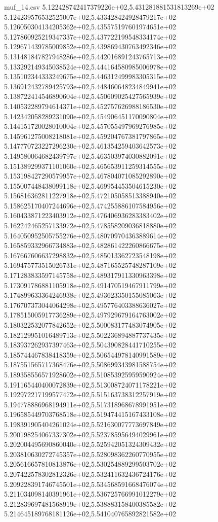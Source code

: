 \begin{filecontents*}{muf_14.csv}
5.122428742417379226e+02,5.431281881531813269e+02
5.124239576532525007e+02,5.433428424928479217e+02
5.126050304134205362e+02,5.435575197601974651e+02
5.127860925219347337e+02,5.437722199548334174e+02
5.129671439785009852e+02,5.439869430763492346e+02
5.131481847827948286e+02,5.442016891243765713e+02
5.133292149345038524e+02,5.444164580985006978e+02
5.135102344333249675e+02,5.446312499983305315e+02
5.136912432789425793e+02,5.448460648234849941e+02
5.138722414546890604e+02,5.450609025427565939e+02
5.140532289794614371e+02,5.452757626988186530e+02
5.142342058289231090e+02,5.454906451170090804e+02
5.144151720028010004e+02,5.457055497969276985e+02
5.145961275008218081e+02,5.459204767381797865e+02
5.147770723227296230e+02,5.461354259403642573e+02
5.149580064682439797e+02,5.463503974030882091e+02
5.151389299371101060e+02,5.465653911259314555e+02
5.153198427290579957e+02,5.467804071085292890e+02
5.155007448438099118e+02,5.469954453504615230e+02
5.156816362811227918e+02,5.472105058513388940e+02
5.158625170407244696e+02,5.474255886107584956e+02
5.160433871223403912e+02,5.476406936283383402e+02
5.162242465257133972e+02,5.478558209036818880e+02
5.164050952505755276e+02,5.480709704363889614e+02
5.165859332966734883e+02,5.482861422260866675e+02
5.167667606637298832e+02,5.485013362723548198e+02
5.169475773515026731e+02,5.487165525748287109e+02
5.171283833597145758e+02,5.489317911330963398e+02
5.173091786881105918e+02,5.491470519467911799e+02
5.174899633364246938e+02,5.493623350155085063e+02
5.176707373044064298e+02,5.495776403388636027e+02
5.178515005917736289e+02,5.497929679164763002e+02
5.180322532077842652e+02,5.500083177483074905e+02
5.182129951016489713e+02,5.502236894887737435e+02
5.183937262937397463e+02,5.504390828441710255e+02
5.185744467838418359e+02,5.506544978140991589e+02
5.187551565717368476e+02,5.508699343981588754e+02
5.189358556571928602e+02,5.510853925959590924e+02
5.191165440400072839e+02,5.513008724071178221e+02
5.192972217199577472e+02,5.515163738312257919e+02
5.194778886968194911e+02,5.517318968678991951e+02
5.196585449703768518e+02,5.519474415167433108e+02
5.198391905404261024e+02,5.521630077773697849e+02
5.200198254067337302e+02,5.523785956494029961e+02
5.202004495690860040e+02,5.525942051324309432e+02
5.203810630272745357e+02,5.528098362260770955e+02
5.205616657810813876e+02,5.530254889299503702e+02
5.207422578302812326e+02,5.532411632436724176e+02
5.209228391746745501e+02,5.534568591668476074e+02
5.211034098140391961e+02,5.536725766991012279e+02
5.212839697481568919e+02,5.538883158400385582e+02
5.214645189768181126e+02,5.541040765892821582e+02

\end{filecontents*}
